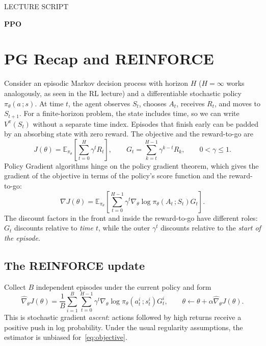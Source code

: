 \documentclass[11pt,a4paper]{article}
\newcommand{\E}{\mathbb{E}}
\begin{document}
{\sffamily\color{accent}\small LECTURE SCRIPT\par}
{\sffamily\bfseries\color{ink}\fontsize{27}{31}\selectfont PPO\par}
\vspace{9pt}

\section{PG Recap and REINFORCE}
Consider an episodic Markov decision process with horizon $H$ ($H=\infty$ works 
analogously, as seen in the RL lecture) and a differentiable
stochastic policy $\pi_\theta(a\,; s)$. At time $t$, the agent observes $S_t$,
chooses $A_t$, receives $R_t$, and moves to $S_{t+1}$. For a finite-horizon
problem, the state includes time, so we can write $V^\pi(S_t)$ without a
separate time index. Episodes that finish early can be padded by an absorbing
state with zero reward. The objective and the reward-to-go are
\begin{equation}\label{eq:objective}
 J(\theta)=\E_{\pi_\theta}\!\left[\sum_{t=0}^{H}\gamma^t R_t\right],
 \qquad G_t=\sum_{k=t}^{H-1}\gamma^{k-t}R_k,
 \qquad 0<\gamma\leq 1.
\end{equation}
Policy Gradient algorithms hinge on the policy gradient theorem, which gives
the gradient of the objective in terms of the policy's score function and the
reward-to-go:
\begin{equation}\label{eq:reinforce}
 \nabla J(\theta)=\E_{\pi_\theta}\!\left[
 \sum_{t=0}^{H-1}\gamma^t\nabla_\theta\log\pi_\theta(A_t\,; S_t)G_t\right].
\end{equation}
The discount factors in the front and inside the reward-to-go have different 
roles: $G_t$ discounts relative to \emph{time $t$}, while the outer $\gamma^t$ 
discounts relative to the \emph{start of the episode}.

\subsection{The REINFORCE update}
Collect $B$ independent episodes under the current policy and form
\begin{equation}\label{eq:reinforce-update}
 \widehat \nabla_\theta J(\theta)=\frac1B\sum_{i=1}^B\sum_{t=0}^{H-1}
 \gamma^t\nabla_\theta\log\pi_\theta(a_t^i\,; s_t^i)G_t^i,
 \qquad \theta\leftarrow\theta+\alpha\widehat \nabla_\theta J(\theta).
\end{equation}
This is stochastic gradient \emph{ascent}: actions followed by high returns
receive a positive push in log probability. Under the usual regularity
assumptions, the estimator is unbiased for~\eqref{eq:objective}.
\end{document}
